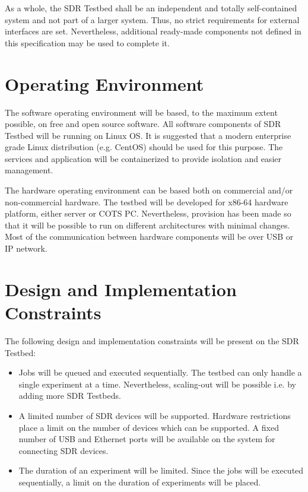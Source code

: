 \documentclass[english,titlepage,a4paper]{report}
\begin{document}
As a whole, the SDR Testbed shall be an independent and totally self-contained system and not part of a larger system.
Thus, no strict requirements for external interfaces are set.
Nevertheless, additional ready-made components not defined in this specification may be used to complete it.

\section{Operating Environment}

The software operating environment will be based, to the maximum extent possible, on free and open source software.
All software components of SDR Testbed will be running on Linux OS.
It is suggested that a modern enterprise grade Linux distribution (e.g. CentOS) should be used for this purpose.
The services and application will be containerized to provide isolation and easier management.

The hardware operating environment can be based both on commercial and/or non-commercial hardware.
The testbed will be developed for x86-64 hardware platform, either server or COTS PC.
Nevertheless, provision has been made so that it will be possible to run on different architectures with minimal changes.
Most of the communication between hardware components will be over USB or IP network.

\section{Design and Implementation Constraints}

The following design and implementation constraints will be present on the SDR Testbed:
\begin{itemize}
\item Jobs will be queued and executed sequentially.
  The testbed can only handle a single experiment at a time.
  Nevertheless, scaling-out will be possible i.e. by adding more SDR Testbeds.
\item A limited number of SDR devices will be supported.
  Hardware restrictions place a limit on the number of devices which can be supported.
  A fixed number of USB and Ethernet ports will be available on the system for connecting SDR devices.
\item The duration of an experiment will be limited.
  Since the jobs will be executed sequentially, a limit on the duration of experiments will be placed.
\end{itemize}
\end{document}
